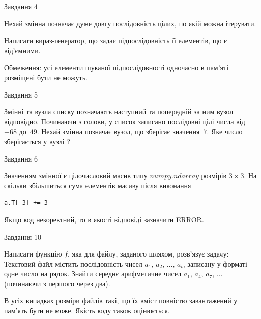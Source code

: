 \documentclass[12pt, ukrainian]{article}
\begin{document}
{               
{\begin{center}Завдання {4}\end{center}}
\vspace{-6mm}
Нехай змінна  позначає дуже довгу послідовність цілих, по якій можна ітерувати.

Написати вираз-генератор, що задає підпослідовність її елементів, що є від'єм\-ни\-ми.

Обмеження: усі елементи шуканої підпослідовності одночасно в пам'яті розміщені бути не можуть.\par

\vspace{10mm}
               
{\begin{center}Завдання {5}\end{center}}
\vspace{-6mm}
Змінні  та  вузла списку позначають наступний та попередній за ним вузол відповідно. Починаючи з голови, у список записано послідовні цілі числа від~$-68$ до~$49$. Нехай змінна  позначає вузол, що зберігає значення~$7$.
Яке число зберігається у вузлі  ?\par

               
{\begin{center}Завдання {6}\end{center}}
\vspace{-6mm}
Значенням змінної  є цілочисловий масив типу $numpy.ndarray$ розмірів $3{\times}3$. На скільки збільшиться сума елементів масиву  після виконання
\begin{verbatim}
a.T[-3] += 3
\end{verbatim}


Якщо код некоректний, то в якості відповіді зазначити ERROR.\par

               
{\begin{center}Завдання {10}\end{center}}
\vspace{-6mm}

Написати функцію $f$, яка для файлу, заданого шляхом, розв’язує задачу:\\ Текстовий файл містить послідовність чисел $a_1$, $a_2$, $\ldots$, $a_t$, записану у форматі одне число на рядок. Знайти середнє арифметичне чисел $a_1$, $a_4$, $a_7$, $\ldots$ (починаючи з першого через два).

В усіх випадках розміри файлів такі, що їх вміст повністю завантажений у пам'ять бути не може. Якість коду також оцінюється.



}
\end{document}
